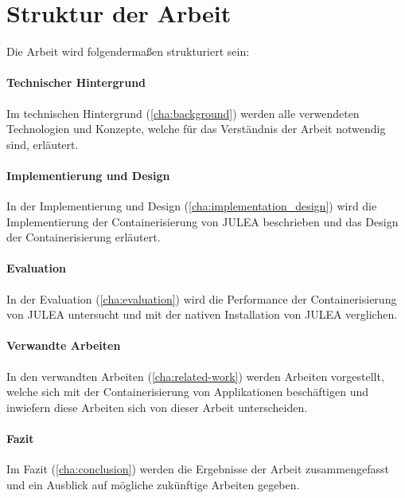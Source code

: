 \section{Struktur der Arbeit}

Die Arbeit wird folgendermaßen strukturiert sein:

\paragraph{Technischer Hintergrund}

Im technischen Hintergrund (\cref{cha:background}) werden alle verwendeten Technologien und Konzepte, welche für das Verständnis der Arbeit notwendig sind, erläutert.

\paragraph{Implementierung und Design}

In der Implementierung und Design (\cref{cha:implementation_design}) wird die Implementierung der Containerisierung von JULEA beschrieben und das Design der Containerisierung erläutert.

\paragraph{Evaluation}

In der Evaluation (\cref{cha:evaluation}) wird die Performance der Containerisierung von JULEA untersucht und mit der nativen Installation von JULEA verglichen.

\paragraph{Verwandte Arbeiten}

In den verwandten Arbeiten (\cref{cha:related-work}) werden Arbeiten vorgestellt, welche sich mit der Containerisierung von Applikationen beschäftigen und inwiefern diese Arbeiten sich von dieser Arbeit unterscheiden.

\paragraph{Fazit}

Im Fazit (\cref{cha:conclusion}) werden die Ergebnisse der Arbeit zusammengefasst und ein Ausblick auf mögliche zukünftige Arbeiten gegeben.

